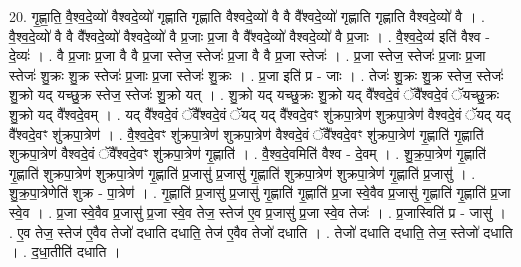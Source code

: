 \documentclass[17pt]{extarticle}
\begin{document}
20. गृ॒ह्णा॒ति॒ वै॒श्व॒दे॒व्यो॑ वैश्वदे॒व्यो॑ गृह्णाति गृह्णाति वैश्वदे॒व्यो॑ वै वै वै᳚श्वदे॒व्यो॑ गृह्णाति गृह्णाति वैश्वदे॒व्यो॑ वै । . वै॒श्व॒दे॒व्यो॑ वै वै वै᳚श्वदे॒व्यो॑ वैश्वदे॒व्यो॑ वै प्र॒जाः प्र॒जा वै वै᳚श्वदे॒व्यो॑ वैश्वदे॒व्यो॑ वै प्र॒जाः । . वै॒श्व॒दे॒व्य॑ इति॑ वैश्व - दे॒व्यः॑ । . वै प्र॒जाः प्र॒जा वै वै प्र॒जा स्तेज॒ स्तेजः॑ प्र॒जा वै वै प्र॒जा स्तेजः॑ । . प्र॒जा स्तेज॒ स्तेजः॑ प्र॒जाः प्र॒जा स्तेजः॑ शु॒क्रः शु॒क्र स्तेजः॑ प्र॒जाः प्र॒जा स्तेजः॑ शु॒क्रः । . प्र॒जा इति॑ प्र - जाः । . तेजः॑ शु॒क्रः शु॒क्र स्तेज॒ स्तेजः॑ शु॒क्रो यद् यच्छु॒क्र स्तेज॒ स्तेजः॑ शु॒क्रो यत् । . शु॒क्रो यद् यच्छु॒क्रः शु॒क्रो यद् वै᳚श्वदे॒वं ॅवै᳚श्वदे॒वं ॅयच्छु॒क्रः शु॒क्रो यद् वै᳚श्वदे॒वम् । . यद् वै᳚श्वदे॒वं ॅवै᳚श्वदे॒वं ॅयद् यद् वै᳚श्वदे॒वꣳ शु॑क्रपा॒त्रेण॑ शुक्रपा॒त्रेण॑ वैश्वदे॒वं ॅयद् यद् वै᳚श्वदे॒वꣳ शु॑क्रपा॒त्रेण॑ । . वै॒श्व॒दे॒वꣳ शु॑क्रपा॒त्रेण॑ शुक्रपा॒त्रेण॑ वैश्वदे॒वं ॅवै᳚श्वदे॒वꣳ शु॑क्रपा॒त्रेण॑ गृ॒ह्णाति॑ गृ॒ह्णाति॑ शुक्रपा॒त्रेण॑ वैश्वदे॒वं ॅवै᳚श्वदे॒वꣳ शु॑क्रपा॒त्रेण॑ गृ॒ह्णाति॑ । . वै॒श्व॒दे॒वमिति॑ वैश्व - दे॒वम् । . शु॒क्र॒पा॒त्रेण॑ गृ॒ह्णाति॑ गृ॒ह्णाति॑ शुक्रपा॒त्रेण॑ शुक्रपा॒त्रेण॑ गृ॒ह्णाति॑ प्र॒जासु॑ प्र॒जासु॑ गृ॒ह्णाति॑ शुक्रपा॒त्रेण॑ शुक्रपा॒त्रेण॑ गृ॒ह्णाति॑ प्र॒जासु॑ । . शु॒क्र॒पा॒त्रेणेति॑ शुक्र - पा॒त्रेण॑ । . गृ॒ह्णाति॑ प्र॒जासु॑ प्र॒जासु॑ गृ॒ह्णाति॑ गृ॒ह्णाति॑ प्र॒जा स्वे॒वैव प्र॒जासु॑ गृ॒ह्णाति॑ गृ॒ह्णाति॑ प्र॒जा स्वे॒व । . प्र॒जा स्वे॒वैव प्र॒जासु॑ प्र॒जा स्वे॒व तेज॒ स्तेज॑ ए॒व प्र॒जासु॑ प्र॒जा स्वे॒व तेजः॑ । . प्र॒जास्विति॑ प्र - जासु॑ । . ए॒व तेज॒ स्तेज॑ ए॒वैव तेजो॑ दधाति दधाति॒ तेज॑ ए॒वैव तेजो॑ दधाति । . तेजो॑ दधाति दधाति॒ तेज॒ स्तेजो॑ दधाति । . द॒धा॒तीति॑ दधाति । \newline
\pagebreak
{}
\end{document}
